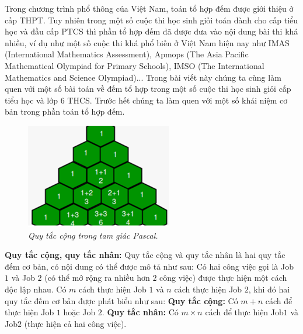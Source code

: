 \begin{multicols}{2}
	Trong chương trình phổ thông của Việt Nam, toán tổ hợp đếm được giới thiệu ở cấp THPT. Tuy nhiên trong một số cuộc thi học sinh giỏi toán dành cho cấp tiểu học và đầu cấp PTCS thì phần tổ hợp đếm đã được đưa vào nội dung bài thi khá nhiều, ví dụ như một số cuộc thi khá phổ biến ở Việt Nam hiện nay như IMAS (International Mathematics Assessment), Apmops (The Asia Pacific Mathematical Olympiad for Primary Schools), IMSO (The International Mathematics and Science Olympiad)...
	\vskip 0.1cm
	Trong bài viết này chúng ta cùng làm quen với một số bài toán về đếm tổ hợp trong một số cuộc thi học sinh giỏi cấp tiểu học và lớp $6$ THCS.
	\vskip 0.1cm
	Trước hết chúng ta làm quen với một số khái niệm cơ bản trong phần toán tổ hợp đếm.
	\begin{figure}[H]
			\centering
			\vspace*{-5pt}
			\captionsetup{labelformat=empty, justification=centering}
			\includegraphics[width=0.9\linewidth]{_1}
			\caption{\small\textit{\color{toancuabi}Quy tắc cộng trong tam giác Pascal.}}
			\vspace*{-10pt}
		\end{figure}
	\textbf{\color{toancuabi}Quy tắc cộng, quy tắc nhân:} Quy tắc cộng và quy tắc nhân là hai quy tắc đếm cơ bản, có nội dung có thể được mô tả như sau:
	\vskip 0.1cm
	Có hai công việc gọi là Job $1$ và Job $2$ (có thể mở rộng ra nhiều hơn $2$ công việc) được thực hiện một cách độc lập nhau. Có $m$ cách thực hiện Job $1$ và $n$ cách thực hiện Job $2$, khi đó hai quy tắc đếm cơ bản được phát biểu như sau:
	\vskip 0.1cm
	\textbf{\color{toancuabi}Quy tắc cộng:} Có $m+n$ cách để thực hiện Job $1$ hoặc Job $2$.
	\vskip 0.1cm
	\textbf{\color{toancuabi}Quy tắc nhân:} Có $m\times n$ cách để thực hiện Job$1$ và Job$2$ (thực hiện cả hai công việc).

\end{multicols}
